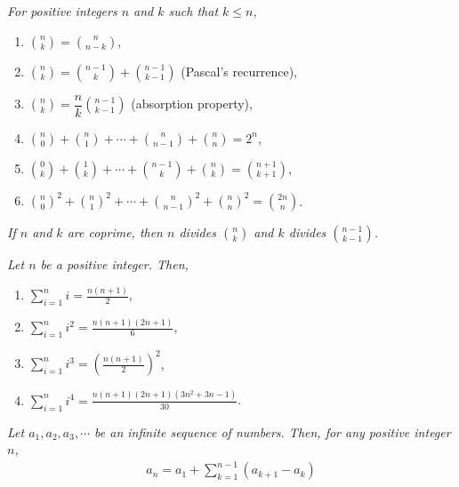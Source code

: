 \documentclass[main.tex]{subfile}
\begin{document}
\begin{appendix}
	\begin{identity}\slshape \label{thm:binom}
		For positive integers $n$ and $k$ such that $k \leq n$,
		\begin{enumerate}
			\item $\displaystyle\binom{n}{k}=\binom{n}{n-k}$,
			\item $\displaystyle\binom{n}{k}=\binom{n-1}k+\binom{n-1}{k-1}$ (Pascal's recurrence),
			\item $\displaystyle\binom{n}{k}=\dfrac{n}{k}\binom{n-1}{k-1}$ (absorption property), \label{id:binomreduction}
			\item $\displaystyle\binom{n}{0}+\binom{n}{1}+\cdots+\binom{n}{n-1}+\binom{n}{n} = 2^n$,
			\item $\displaystyle \binom{0}{k} + \binom{1}{k} + \cdots +\binom{n-1}{k} + \binom{n}{k} = \binom{n+1}{k+1}$,
			\item $\displaystyle\binom{n}0^2+\binom{n}{1}^2+\cdots+\binom{n}{n-1}^2+\binom{n}{n}^2 = \binom{2n}{n}$. \label{id:binomsquaressum}
		\end{enumerate}
	\end{identity}

	\begin{identity}\slshape
		If $n$ and $k$ are coprime, then $n$ divides $\binom nk$ and $k$ divides $\binom{n-1}{k-1}$.
	\end{identity}

	\begin{identity}\slshape\label{id:sumofpowers}
		Let $n$ be a positive integer. Then,
			\begin{enumerate}
				\item $\displaystyle\sum\limits_{i=1}^{n} i = \frac{n(n+1)}{2}$,
				\item $\displaystyle\sum\limits_{i=1}^{n} i^2 = \frac{n(n+1)(2n+1)}{6}$,
				\item $\displaystyle\sum\limits_{i=1}^{n} i^3 = \left(\frac{n(n+1)}{2}\right)^2$,
				\item $\displaystyle\sum\limits_{i=1}^{n} i^4 = \frac{n(n+1)(2n+1)(3n^2+3n-1)}{30}$.
			\end{enumerate}
	\end{identity}

	\begin{identity}\slshape\label{id:sumofdif}
		Let $a_1, a_2, a_3, \cdots$ be an infinite sequence of numbers. Then, for any positive integer $n$,
			\begin{align*}
				a_n  = a_1 + \sum_{k=1}^{n-1} \left(a_{k+1} - a_{k}\right)
			\end{align*}
	\end{identity}


\end{appendix}
\end{document}
